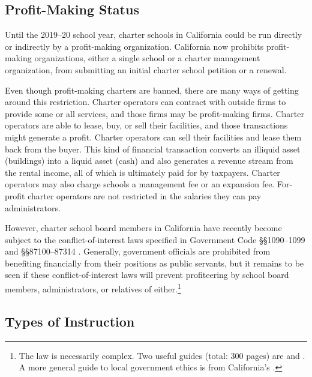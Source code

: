 \subsection{Profit-Making Status}\indent

Until the 2019–20 school year, charter schools in California could be run directly or indirectly by a profit-making organization. California now prohibits profit-making organizations, either a single school or a charter management organization, from submitting an initial charter school petition or a renewal.

Even though profit-making charters are banned, there are many ways of getting around this restriction. Charter operators can contract with outside firms to provide some or all services, and those firms may be profit-making firms. Charter operators are able to lease, buy, or sell their facilities, and those transactions might generate a profit. Charter operators can sell their facilities and lease them back from the buyer. This kind of financial transaction converts an illiquid asset (buildings) into a liquid asset (cash) and also generates a revenue stream from the rental income, all of which is ultimately paid for by taxpayers. Charter operators may also charge schools a management fee or an expansion fee. For-profit charter operators are not restricted in the salaries they can pay administrators.

However, charter school board members in California have recently become subject to the conflict-of-interest laws specified in Government Code §§1090–1099 and §§87100–87314 \parencite{Becerra.Medeiros2018}. Generally, government officials are prohibited from benefiting financially from their positions as public servants, but it remains to be seen if these conflict-of-interest laws will prevent profiteering by school board members, administrators, or relatives of either.\footnote{The law is necessarily complex. Two useful guides (total: 300 pages) are \textcite{Chaney.etal2010} and \textcite{Ennis.etal2016}. A more general guide to local government ethics is  from California's \citeauthor{InstituteForLocalGovernment2016} \parencite{InstituteForLocalGovernment2016}.}

\newpage
\subsection{Types of Instruction}%
\label{sec:types-instruction}\indent%


